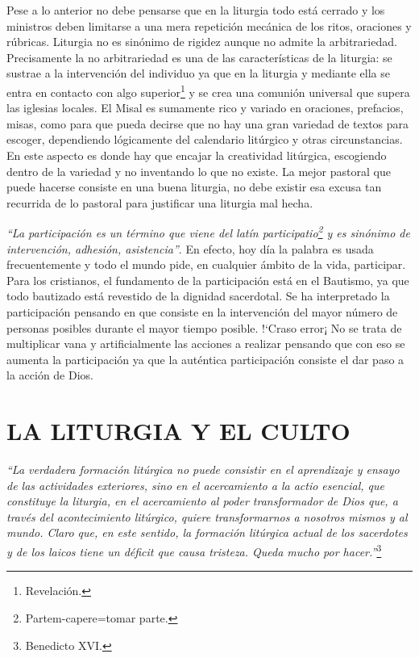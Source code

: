\documentclass[letterpaper, 12pt]{book}
\begin{document}
    Pese a lo anterior no debe pensarse que en la liturgia todo está cerrado y los ministros deben limitarse a una mera repetici\'on mec\'anica de los ritos, oraciones y r\'ubricas. Liturgia no es sin\'onimo de rigidez aunque no admite la arbitrariedad. Precisamente la no arbitrariedad es una de las características de la liturgia: se sustrae a la intervención del individuo ya que en la liturgia y mediante ella se entra en contacto con algo superior\footnote{Revelaci\'on.} y se crea una comuni\'on universal que supera las iglesias locales. El Misal es sumamente rico y variado en oraciones, prefacios, misas, como para que pueda decirse que no hay una gran variedad de textos para escoger, dependiendo l\'ogicamente del calendario lit\'urgico y otras circunstancias. En este aspecto es donde hay que encajar la creatividad lit\'urgica, escogiendo dentro de la variedad y no inventando lo que no existe. La mejor pastoral que puede hacerse consiste en una buena liturgia, no debe existir esa excusa tan recurrida de lo pastoral para justificar una liturgia mal hecha.\newline
    
    \textit{``La participaci\'on es un término que viene del lat\'in participatio\footnote{Partem-capere=tomar parte.} y es sin\'onimo de intervenci\'on, adhesión, asistencia''}. En efecto, hoy día la palabra es usada frecuentemente y todo el mundo pide, en cualquier \'ambito de la vida, participar. Para los cristianos, el fundamento de la participaci\'on est\'a en el Bautismo, ya que todo bautizado est\'a revestido de la dignidad sacerdotal. Se ha interpretado la participaci\'on pensando en que consiste en la intervenci\'on del mayor n\'umero de personas posibles durante el mayor tiempo posible. !`Craso error¡ No se trata de multiplicar vana y artificialmente las acciones a realizar pensando que con eso se aumenta la participaci\'on ya que la aut\'entica participación consiste el dar paso a la acci\'on de Dios.
    
    \chapter{LA LITURGIA Y EL CULTO}
    \textit{``La verdadera formaci\'on lit\'urgica no puede consistir en el aprendizaje y ensayo de las actividades exteriores, sino en el acercamiento a la actio esencial, que constituye la liturgia, en el acercamiento al poder transformador de Dios que, a trav\'es del acontecimiento lit\'urgico, quiere transformarnos a nosotros mismos y al mundo. Claro que, en este sentido, la formaci\'on lit\'urgica actual de los sacerdotes y de los laicos tiene un d\'eficit que causa tristeza. Queda mucho por hacer.''}\footnote{Benedicto XVI.}\newline
    
\end{document}

